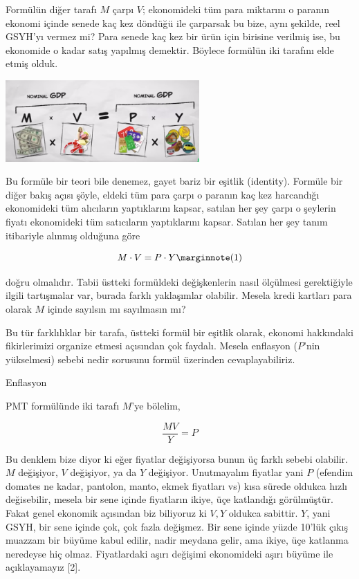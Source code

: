 \documentclass[12pt,fleqn]{article}\usepackage{../../common}
\begin{document}
Formülün diğer tarafı $M$ çarpı $V$; ekonomideki tüm para miktarını o
paranın ekonomi içinde senede kaç kez döndüğü ile çarparsak bu bize, aynı
şekilde, reel GSYH'yı vermez mi? Para senede kaç kez bir ürün için birisine
verilmiş ise, bu ekonomide o kadar satış yapılmış demektir. Böylece
formülün iki tarafını elde etmiş olduk.

\includegraphics[width=20em]{tser_macro_03.png}

Bu formüle bir teori bile denemez, gayet bariz bir eşitlik
(identity). Formüle bir diğer bakış açısı şöyle, eldeki tüm para çarpı o
paranın kaç kez harcandığı ekonomideki tüm alıcıların yaptıklarını kapsar,
satılan her şey çarpı o şeylerin fiyatı ekonomideki tüm satıcıların
yaptıklarını kapsar. Satılan her şey tanım itibariyle alınmış olduğuna göre

$$ 
M \cdot V = P \cdot Y 
\mlabel{1}
$$

doğru olmalıdır. Tabii üstteki formüldeki değişkenlerin nasıl ölçülmesi
gerektiğiyle ilgili tartışmalar var, burada farklı yaklaşımlar
olabilir. Mesela kredi kartları para olarak $M$ içinde sayılsın mı
sayılmasın mı?

Bu tür farklılıklar bir tarafa, üstteki formül bir eşitlik olarak, ekonomi
hakkındaki fikirlerimizi organize etmesi açısından çok faydalı. Mesela
enflasyon ($P$'nin yükselmesi) sebebi nedir sorusunu formül üzerinden
cevaplayabiliriz.

Enflasyon

PMT formülünde iki tarafı $M$'ye bölelim,

$$ \frac{MV}{Y} = P$$

Bu denklem bize diyor ki eğer fiyatlar değişiyorsa bunun üç farklı sebebi
olabilir. $M$ değişiyor, $V$ değişiyor, ya da $Y$ değişiyor. Unutmayalım
fiyatlar yani $P$ (efendim domates ne kadar, pantolon, manto, ekmek
fiyatları vs) kısa sürede oldukca hızlı değisebilir, mesela bir sene içinde
fiyatların ikiye, üçe katlandığı görülmüştür. Fakat genel ekonomik
açısından biz biliyoruz ki $V,Y$ oldukca sabittir. $Y$, yani GSYH, bir sene
içinde çok, çok fazla değişmez. Bir sene içinde yüzde 10'lük çıkış muazzam
bir büyüme kabul edilir, nadir meydana gelir, ama ikiye, üçe katlanma
neredeyse hiç olmaz. Fiyatlardaki aşırı değişimi ekonomideki aşırı büyüme
ile açıklayamayız [2].
\end{document}
